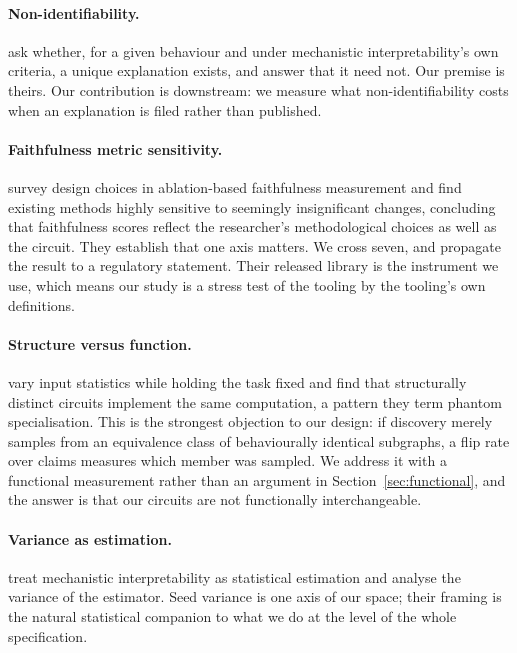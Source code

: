 \documentclass[11pt]{article}
\begin{document}
\paragraph{Non-identifiability.} \citet{meloux2025} ask whether, for a given
behaviour and under mechanistic interpretability's own criteria, a unique
explanation exists, and answer that it need not. Our premise is theirs. Our
contribution is downstream: we measure what non-identifiability costs when an
explanation is filed rather than published.

\paragraph{Faithfulness metric sensitivity.} \citet{miller2024} survey design
choices in ablation-based faithfulness measurement and find existing methods
highly sensitive to seemingly insignificant changes, concluding that faithfulness
scores reflect the researcher's methodological choices as well as the circuit.
They establish that one axis matters. We cross seven, and propagate the result to
a regulatory statement. Their released library is the instrument we use, which
means our study is a stress test of the tooling by the tooling's own definitions.

\paragraph{Structure versus function.} \citet{bayatmakou2026} vary input
statistics while holding the task fixed and find that structurally distinct
circuits implement the same computation, a pattern they term phantom
specialisation. This is the strongest objection to our design: if discovery merely
samples from an equivalence class of behaviourally identical subgraphs, a flip
rate over claims measures which member was sampled. We address it with a
functional measurement rather than an argument in Section~\ref{sec:functional},
and the answer is that our circuits are not functionally interchangeable.

\paragraph{Variance as estimation.} \citet{meloux2025b} treat mechanistic
interpretability as statistical estimation and analyse the variance of the
estimator. Seed variance is one axis of our space; their framing is the natural
statistical companion to what we do at the level of the whole specification.
\end{document}
